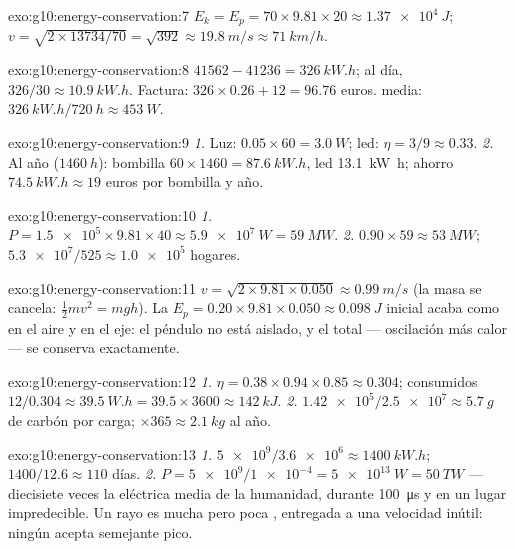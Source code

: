 \begin{solution}{exo:g10:energy-conservation:7}
$E_k = E_p = 70 \times 9.81 \times 20 \approx \qty{1.37e4}{J}$;
$v = \sqrt{2 \times 13734/70} = \sqrt{392} \approx \qty{19.8}{m/s}
\approx \qty{71}{km/h}$.
\end{solution}

\begin{solution}{exo:g10:energy-conservation:8}
$41562 - 41236 = \qty{326}{kW.h}$; al día,
$326/30 \approx \qty{10.9}{kW.h}$. Factura:
$326 \times 0.26 + 12 = 96.76$ euros.  media:
$\qty{326}{kW.h}/\qty{720}{h} \approx \qty{453}{W}$.
\end{solution}

\begin{solution}{exo:g10:energy-conservation:9}
\emph{1.} Luz: $0.05 \times 60 = \qty{3.0}{W}$; led:
$\eta = 3/9 \approx 0.33$.
\emph{2.} Al año ($\qty{1460}{h}$): bombilla
$60 \times 1460 = \qty{87.6}{kW.h}$, led \qty{13.1}{kW.h}; ahorro
$\qty{74.5}{kW.h} \approx 19$ euros por bombilla y año.
\end{solution}

\begin{solution}{exo:g10:energy-conservation:10}
\emph{1.} $P = \num{1.5e5} \times 9.81 \times 40 \approx
\qty{5.9e7}{W} = \qty{59}{MW}$.
\emph{2.} $0.90 \times 59 \approx \qty{53}{MW}$;
$\num{5.3e7}/525 \approx \num{1.0e5}$ hogares.
\end{solution}

\begin{solution}{exo:g10:energy-conservation:11}
$v = \sqrt{2 \times 9.81 \times 0.050} \approx \qty{0.99}{m/s}$ (la masa
se cancela: $\tfrac12 m v^2 = mgh$). La
$E_p = 0.20 \times 9.81 \times 0.050 \approx \qty{0.098}{J}$ inicial
acaba como  en el aire y en el eje: el péndulo no está
aislado, y el total --- oscilación más calor --- se conserva
exactamente.
\end{solution}

\begin{solution}{exo:g10:energy-conservation:12}
\emph{1.} $\eta = 0.38 \times 0.94 \times 0.85 \approx 0.304$;
consumidos $12/0.304 \approx \qty{39.5}{W.h}
= 39.5 \times 3600 \approx \qty{142}{kJ}$.
\emph{2.} $\num{1.42e5}/\num{2.5e7} \approx \qty{5.7}{g}$ de carbón por
carga; $\times 365 \approx \qty{2.1}{kg}$ al año.
\end{solution}

\begin{solution}{exo:g10:energy-conservation:13}
\emph{1.} $\num{5e9}/\num{3.6e6} \approx \qty{1400}{kW.h}$;
$1400/12.6 \approx 110$ días.
\emph{2.} $P = \num{5e9}/\num{1e-4} = \qty{5e13}{W} = \qty{50}{TW}$ ---
diecisiete veces la  eléctrica media de la humanidad, durante
\qty{100}{\micro s} y en un lugar impredecible. Un rayo es mucha
 pero poca , entregada a una velocidad inútil: ningún
 acepta semejante pico.
\end{solution}

